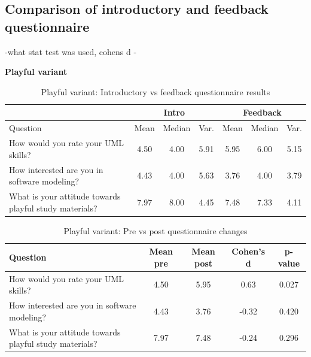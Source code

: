 \subsection{Comparison of introductory and feedback questionnaire}

-what stat test was used, cohens d
-

\textbf{Playful variant}


\FloatBarrier
\begin{table}[h]
\centering
\small
\renewcommand{\arraystretch}{1.2}
\begin{tabular}{>{\raggedright\arraybackslash}p{6cm}|ccc|ccc}
\hline
 & \multicolumn{3}{c|}{Intro} & \multicolumn{3}{c}{Feedback} \\
\hline
Question & Mean & Median & Var. & Mean & Median & Var. \\
\hline

How would you rate your UML skills?
& 4.50 & 4.00 & 5.91 & 5.95 & 6.00 & 5.15 \\

How interested are you in software modeling?
& 4.43 & 4.00 & 5.63 & 3.76 & 4.00 & 3.79 \\

What is your attitude towards playful study materials?
& 7.97 & 8.00 & 4.45 & 7.48 & 7.33 & 4.11 \\

\hline
\end{tabular}
\caption{Playful variant: Introductory vs feedback questionnaire results}
\end{table}
\FloatBarrier


\FloatBarrier
\begin{table}[h]
\centering
\small
\renewcommand{\arraystretch}{1.2}
\begin{tabular}{>{\raggedright\arraybackslash}p{6cm}|cccc}
\hline
Question & Mean pre & Mean post & Cohen's d & p-value \\
\hline

How would you rate your UML skills?
& 4.50 & 5.95 & 0.63 & 0.027 \\

How interested are you in software modeling?
& 4.43 & 3.76 & -0.32 & 0.420 \\

What is your attitude towards playful study materials?
& 7.97 & 7.48 & -0.24 & 0.296 \\

\hline
\end{tabular}
\caption{Playful variant: Pre vs post questionnaire changes}
\end{table}
\FloatBarrier


